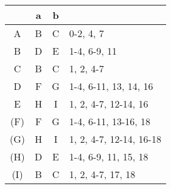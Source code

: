 \documentclass[11pt,a4paper]{report}
\begin{document}
\begin{tabular} {| c | c |c | l |}
\hline 
& a & b & \\ \hline
A & B & C & 0-2, 4, 7\\ \hline
B & D & E & 1-4, 6-9, 11\\ \hline
C & B & C & 1, 2, 4-7\\ \hline
D & F & G & 1-4, 6-11, 13, 14, 16\\ \hline
E & H & I & 1, 2, 4-7, 12-14, 16\\ \hline
(F) & F & G & 1-4, 6-11, 13-16, 18\\ \hline
(G) & H & I & 1, 2, 4-7, 12-14, 16-18\\ \hline
(H) & D & E & 1-4, 6-9, 11, 15, 18\\ \hline
(I) & B & C & 1, 2, 4-7, 17, 18\\ \hline
\end{tabular}
\end{document}
